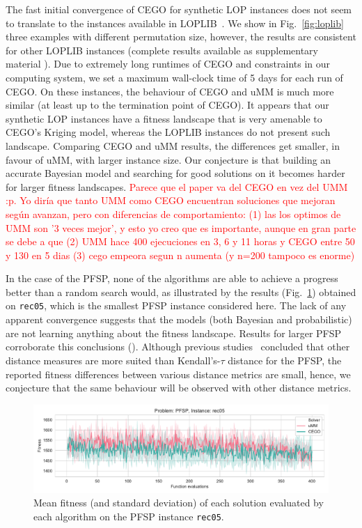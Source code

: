\documentclass[runningheads]{llncs}
\begin{document}
The fast initial convergence of CEGO for synthetic LOP instances does not seem
to translate to the instances available in LOPLIB~\citep{}. We show in
Fig.~\ref{fig:loplib} three examples with different permutation size, however,
the results are consistent for other LOPLIB instances (complete results
available as supplementary material \supplement). Due to extremely long
runtimes of CEGO and constraints in our computing system, we set a maximum
wall-clock time of 5 days for each run of CEGO. On these instances, the
behaviour of CEGO and uMM is much more similar (at least up to the termination
point of CEGO). It appears that our synthetic LOP instances have a fitness
landscape that is very amenable to CEGO's Kriging model, whereas the LOPLIB
instances do not present such landscape. Comparing CEGO and uMM results, the
differences get smaller, in favour of uMM, with larger instance size. Our
conjecture is that building an accurate Bayesian model and searching for good
solutions on it becomes harder for larger fitness landscapes. 
\textcolor{red}{Parece que el paper va del CEGO en vez del UMM :p. Yo diría que tanto UMM como CEGO encuentran soluciones que mejoran según avanzan, pero con diferencias de comportamiento: (1) las los optimos de UMM son '3 veces mejor', y esto yo creo que es importante, aunque en gran parte se debe a que (2) UMM hace 400 ejecuciones en 3, 6 y 11 horas y CEGO entre 50 y 130 en 5 dias (3) cego empeora segun n aumenta (y n=200 tampoco es enorme)}

In the case of the PFSP, none of the algorithms are able to achieve a
  progress better than a random search would, as illustrated by the results
  (Fig.~\ref{fig:rec05}) obtained on \texttt{rec05}, which is the smallest PFSP
  instance considered here. The lack of any apparent convergence suggests that
  the models (both Bayesian and probabilistic) are not learning anything about
  the fitness landscape. Results for larger PFSP corroborate this conclusions
  (\supplement). Although previous studies~\citep{ZaeStoBar2014:ppsn} concluded
  that other distance measures are more suited than Kendall's-$\tau$ distance
  for the PFSP, the reported fitness differences between various distance
  metrics are small, hence, we conjecture that the same behaviour will be
  observed with other distance metrics.
  

\begin{figure}
  \centering%
  \includegraphics[width=\textwidth]{img/fitness_real_pfsp_rec05_txt}
  \caption{Mean fitness  (and standard deviation)  of each solution evaluated by each algorithm on the PFSP instance \texttt{rec05}.\label{fig:rec05}}
\end{figure}
\end{document}
